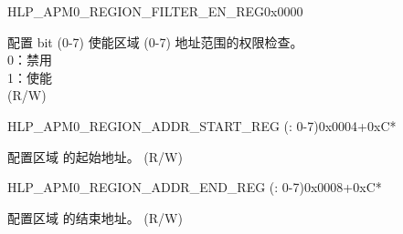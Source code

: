 \begin{register}{H}{LP\_APM0\_REGION\_FILTER\_EN\_REG}{0x0000}\label{regdesc:LPAPM0REGIONFILTERENREG}
%
%
\regnewline%
\begin{regdesc}\begin{reglist}
\label{fielddesc:LPAPM0REGIONFILTEREN}\item [LP\_APM0\_REGION\_FILTER\_EN] 配置 bit  (0-7) 使能区域  (0-7) 地址范围的权限检查。\\
0：禁用 \\
1：使能  \\ (R/W)
\end{reglist}\end{regdesc}
\end{register}


\begin{register}{H}{LP\_APM0\_REGION\_ADDR\_START\_REG (: 0-7)}{0x0004+0xC*}\label{regdesc:LPAPM0REGIONNADDRSTARTREG}
%
\regnewline%
\begin{regdesc}\begin{reglist}
\label{fielddesc:LPAPM0REGIONNADDRSTART}\item [LP\_APM0\_REGION\regindex{n}\_ADDR\_START] 配置区域  的起始地址。 (R/W)
\end{reglist}\end{regdesc}
\end{register}


\begin{register}{H}{LP\_APM0\_REGION\_ADDR\_END\_REG (: 0-7)}{0x0008+0xC*}\label{regdesc:LPAPM0REGIONNADDRENDREG}
%
\regnewline%
\begin{regdesc}\begin{reglist}
\label{fielddesc:LPAPM0REGIONNADDREND}\item [LP\_APM0\_REGION\regindex{n}\_ADDR\_END] 配置区域  的结束地址。 (R/W)
\end{reglist}\end{regdesc}
\end{register}


